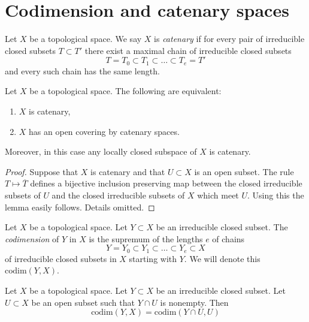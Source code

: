 \section{Codimension and catenary spaces}
\label{section-catenary-spaces}

\begin{definition}
\label{definition-catenary}
Let $X$ be a topological space. We say $X$ is {\it catenary} if
for every pair of irreducible closed subsets $T \subset T'$
there exist a maximal chain of irreducible closed subsets
$$
T = T_0 \subset T_1 \subset \ldots \subset T_e = T'
$$
and every such chain has the same length.
\end{definition}

\begin{lemma}
\label{lemma-catenary}
Let $X$ be a topological space.
The following are equivalent:
\begin{enumerate}
\item $X$ is catenary,
\item $X$ has an open covering by catenary spaces.
\end{enumerate}
Moreover, in this case any locally closed subspace of $X$ is catenary.
\end{lemma}

\begin{proof}
Suppose that $X$ is catenary and that $U \subset X$ is an open
subset. The rule $T \mapsto \overline{T}$ defines a bijective
inclusion preserving map between the closed irreducible subsets
of $U$ and the closed irreducible subsets of $X$ which meet $U$.
Using this the lemma easily follows. Details omitted.
\end{proof}

\begin{definition}
\label{definition-codimension}
Let $X$ be a topological space.
Let $Y \subset X$ be an irreducible closed subset.
The {\it codimension} of $Y$ in $X$ is the supremum of
the lengths $e$ of chains
$$
Y = Y_0 \subset Y_1 \subset \ldots \subset Y_e \subset X
$$
of irreducible closed subsets in $X$ starting with $Y$.
We will denote this $\text{codim}(Y, X)$.
\end{definition}

\begin{lemma}
\label{lemma-codimension-at-generic-point}
Let $X$ be a topological space.
Let $Y \subset X$ be an irreducible closed subset.
Let $U \subset X$ be an open subset such that $Y \cap U$ is nonempty.
Then
$$
\text{codim}(Y, X) = \text{codim}(Y \cap U, U)
$$
\end{lemma}

